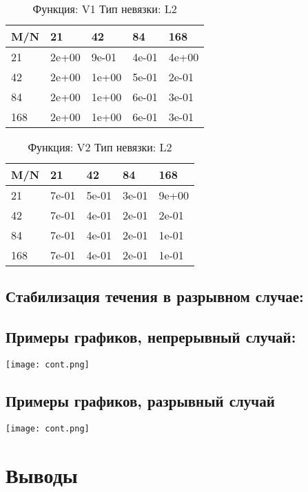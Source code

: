 \documentclass[a4paper,11pt]{article}
\begin{document}
\begin{table}[H]
\caption {Функция: V1 Тип невязки: L2  }
\begin{center}
\begin{tabular}{l|l|l|l|l}
\hline
M/N  & 21 & 42 & 84 & 168 \\ \hline
  21 & 2e+00& 9e-01& 4e-01& 4e+00\\ \hline
  42 & 2e+00& 1e+00& 5e-01& 2e-01\\ \hline
  84 & 2e+00& 1e+00& 6e-01& 3e-01\\ \hline
 168 & 2e+00& 1e+00& 6e-01& 3e-01\\ \hline
\end{tabular}
\end{center}
\end{table}
\begin{table}[H]
\caption {Функция: V2 Тип невязки: L2  }
\begin{center}
\begin{tabular}{l|l|l|l|l}
\hline
M/N  & 21 & 42 & 84 & 168 \\ \hline
  21 & 7e-01& 5e-01& 3e-01& 9e+00\\ \hline
  42 & 7e-01& 4e-01& 2e-01& 2e-01\\ \hline
  84 & 7e-01& 4e-01& 2e-01& 1e-01\\ \hline
 168 & 7e-01& 4e-01& 2e-01& 1e-01\\ \hline
\end{tabular}
\end{center}
\end{table}

\subsection{Стабилизация течения в разрывном случае:}

\subsection{Примеры графиков, непрерывный случай:}
\texttt{[image: cont.png]}

\subsection{Примеры графиков, разрывный случай}
\texttt{[image: cont.png]}

\section{Выводы}
\end{document}
